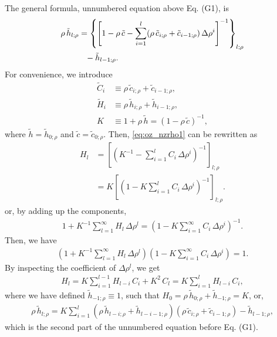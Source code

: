 \documentclass[preprint]{revtex4-1}
\numberwithin{equation}{subsection}
\numberwithin{table}{section}
\begin{document}
The general formula, unnumbered equation above Eq. (G1), is
%
\begin{align}
  \rho \, \tilde h_{l;\rho}
&=
\left\{
  \left[
    1 - \rho \, \tilde c
    - \sum_{i = 1}^l
        (\rho \, \tilde c_{i;\rho} + \tilde c_{i-1;\rho})
          \, \Delta \rho^i
  \right]^{-1}
\right\}_{l;\rho}
\notag \\
&\hphantom{=}- \tilde h_{l-1; \rho}.
\label{eq:oz_nzrho1}
\end{align}
%
For convenience,
we introduce
\begin{align*}
  \tilde C_i
&\equiv
  \rho \, \tilde c_{i;\rho} + \tilde c_{i-1;\rho},
\\
  \tilde H_i
&\equiv
  \rho \, \tilde h_{i;\rho} + \tilde h_{i-1;\rho},
\\
  K
&\equiv
  1 + \rho \, \tilde h
  =
  (1 - \rho \, \tilde c)^{-1},
\end{align*}
%
where
$\tilde h = \tilde h_{0;\rho}$
and
$\tilde c = \tilde c_{0;\rho}$.
%
Then, \eqref{eq:oz_nzrho1} can be rewritten as
\begin{align*}
  H_l
&=
  \left[
    \left(
      K^{-1} - \sum_{i = 1}^l C_i \, \Delta \rho^i
    \right)^{-1}
  \right]_{l;\rho}
\\
&= K
  \left[
    \left(
      1 - K \sum_{i = 1}^l C_i \, \Delta \rho^i
    \right)^{-1}
  \right]_{l;\rho}.
\end{align*}
%
or, by adding up the components,
%
\begin{align*}
  1 + K^{-1} \sum_{l = 1}^\infty H_l \, \Delta \rho^l
=
  \left(
    1 - K \sum_{i = 1}^\infty C_i \, \Delta \rho^i
  \right)^{-1}.
\end{align*}
%
Then, we have
%
\begin{align*}
  \left(
    1 + K^{-1} \sum_{l = 1}^\infty H_l \, \Delta \rho^l
  \right)
  \left(
    1 - K \sum_{i = 1}^\infty C_i \, \Delta \rho^i
  \right)
=
  1.
\end{align*}
By inspecting the coefficient of $\Delta \rho^l$, we get
\begin{align*}
  H_l
= K \sum_{i = 1}^{l - 1} H_{l - i} \, C_i + K^2 \, C_l
= K \sum_{i = 1}^{l} H_{l - i} \, C_i,
\end{align*}
where
we have defined $\tilde h_{-1;\rho} \equiv 1$,
such that $H_0 = \rho \, \tilde h_{0;\rho} + \tilde h_{-1;\rho} = K$,
or,
\begin{align}
  \rho \, \tilde h_{l;\rho}
=
  K \sum_{i = 1}^{l}
  (\rho \, \tilde h_{l-i;\rho} + \tilde h_{l-i-1;\rho})
  (\rho \, \tilde c_{i;\rho} + \tilde c_{i-1;\rho})
  - \tilde h_{l-1;\rho},
  \label{eq:hc_nzrho}
\end{align}
which is the second part of the unnumbered equation
before Eq. (G1).
\end{document}
